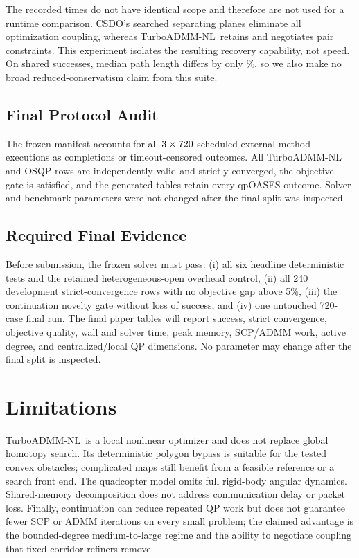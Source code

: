 \documentclass[letterpaper,10pt,conference]{ieeeconf}
\newcommand{\method}{TurboADMM-NL}
\begin{document}
The recorded times do not have identical scope and therefore are not used for
a runtime comparison. CSDO's searched separating planes eliminate all
optimization coupling, whereas \method\ retains and negotiates pair
constraints. This experiment isolates the resulting recovery capability, not
speed. On shared successes, median path length differs by only
\SharedPathReductionPercent\%, so we also make no broad reduced-conservatism
claim from this suite.

\ifdefined\PrimaryQpOASESSuccessNFour
\subsection{Final Protocol Audit}
The frozen manifest accounts for all $3\times720$ scheduled
external-method executions as completions or timeout-censored outcomes. All
\method{} and OSQP rows are independently valid and strictly converged, the
objective gate is satisfied, and the generated tables retain every qpOASES
outcome. Solver and benchmark parameters were not changed after the final split
was inspected.
\else
\subsection{Required Final Evidence}
Before submission, the frozen solver must pass: (i) all six headline
deterministic tests and the retained heterogeneous-open overhead control,
(ii) all 240 development strict-convergence rows with
no objective gap above 5\%, (iii) the continuation novelty gate without loss
of success, and (iv) one untouched 720-case final run. The final paper tables
will report success, strict convergence, objective quality, wall and solver
time, peak memory, SCP/ADMM work, active degree, and centralized/local QP
dimensions. No parameter may change after the final split is inspected.
\fi

\section{Limitations}
\label{sec:limitations}
\method\ is a local nonlinear optimizer and does not replace global homotopy
search. Its deterministic polygon bypass is suitable for the tested convex
obstacles; complicated maps still benefit from a feasible reference or a
search front end. The quadcopter model omits full rigid-body angular dynamics.
Shared-memory decomposition does not address communication delay or packet
loss. Finally, continuation can reduce repeated QP work but does not guarantee
fewer SCP or ADMM iterations on every small problem; the claimed advantage is
the bounded-degree medium-to-large regime and the ability to negotiate
coupling that fixed-corridor refiners remove.
\end{document}
